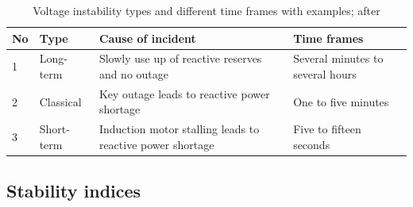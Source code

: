 \begin{table}
    \centering
    \caption{Voltage instability types and different time frames with examples; after \quelle}
    \small
    \renewcommand\tabularxcolumn[1]{m{#1}}
    \vspace*{12pt}
    \begin{tabularx}{\textwidth}{llXX}
        \toprule
        \textbf{No} & \textbf{Type} & \textbf{Cause of incident} & \textbf{Time frames} \\
        \toprule
        1 & Long-term & Slowly use up of reactive reserves and no outage & Several minutes to several hours \\
        2 & Classical & Key outage leads to reactive power shortage & One to five minutes \\
        3 & Short-term & Induction motor stalling leads to reactive power shortage & Five to fifteen seconds \\
        \bottomrule
    \end{tabularx}
\end{table}

\subsection{Stability indices}

